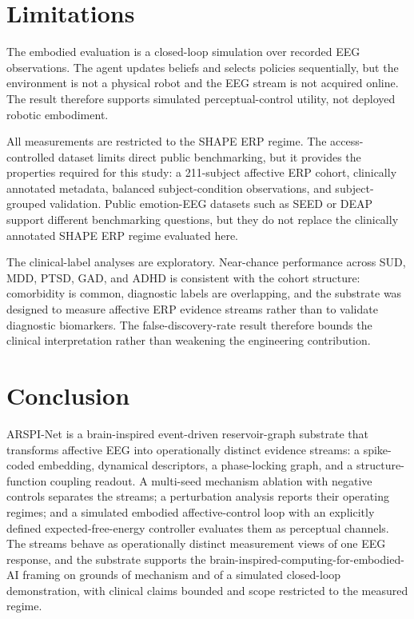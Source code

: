 \documentclass[journal]{IEEEtran}
\begin{document}
\section{Limitations}
The embodied evaluation is a closed-loop simulation over recorded EEG observations. The agent updates beliefs and selects policies sequentially, but the environment is not a physical robot and the EEG stream is not acquired online. The result therefore supports simulated perceptual-control utility, not deployed robotic embodiment.

All measurements are restricted to the SHAPE ERP regime. The access-controlled dataset limits direct public benchmarking, but it provides the properties required for this study: a 211-subject affective ERP cohort, clinically annotated metadata, balanced subject-condition observations, and subject-grouped validation. Public emotion-EEG datasets such as SEED or DEAP support different benchmarking questions, but they do not replace the clinically annotated SHAPE ERP regime evaluated here.

The clinical-label analyses are exploratory. Near-chance performance across SUD, MDD, PTSD, GAD, and ADHD is consistent with the cohort structure: comorbidity is common, diagnostic labels are overlapping, and the substrate was designed to measure affective ERP evidence streams rather than to validate diagnostic biomarkers. The false-discovery-rate result therefore bounds the clinical interpretation rather than weakening the engineering contribution.

\section{Conclusion}
ARSPI-Net is a brain-inspired event-driven reservoir-graph substrate that transforms affective EEG into operationally distinct evidence streams: a spike-coded embedding, dynamical descriptors, a phase-locking graph, and a structure-function coupling readout. A multi-seed mechanism ablation with negative controls separates the streams; a perturbation analysis reports their operating regimes; and a simulated embodied affective-control loop with an explicitly defined expected-free-energy controller evaluates them as perceptual channels. The streams behave as operationally distinct measurement views of one EEG response, and the substrate supports the brain-inspired-computing-for-embodied-AI framing on grounds of mechanism and of a simulated closed-loop demonstration, with clinical claims bounded and scope restricted to the measured regime.
\end{document}
